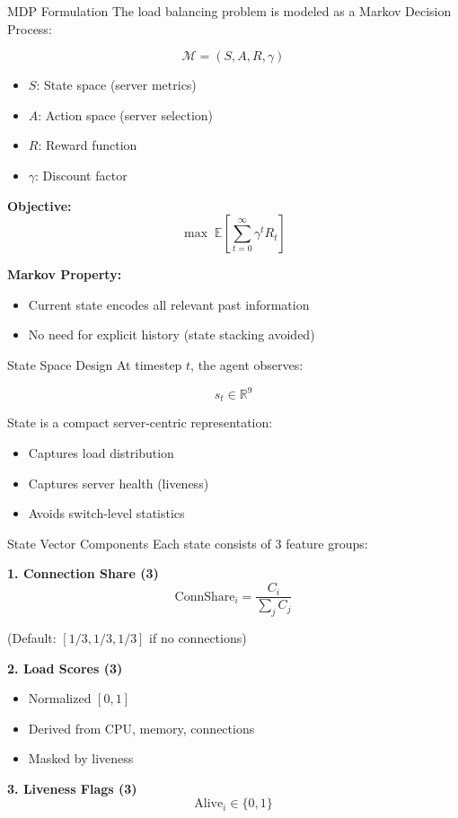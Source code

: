 \begin{frame}{MDP Formulation}
The load balancing problem is modeled as a Markov Decision Process:

\[
\mathcal{M} = (S, A, R, \gamma)
\]

\begin{itemize}
    \item $S$: State space (server metrics)
    \item $A$: Action space (server selection)
    \item $R$: Reward function
    \item $\gamma$: Discount factor
\end{itemize}

\textbf{Objective:}
\[
\max \; \mathbb{E} \left[ \sum_{t=0}^{\infty} \gamma^t R_t \right]
\]

\textbf{Markov Property:}
\begin{itemize}
    \item Current state encodes all relevant past information
    \item No need for explicit history (state stacking avoided)
\end{itemize}
\end{frame}

\begin{frame}{State Space Design}
At timestep $t$, the agent observes:

\[
s_t \in \mathbb{R}^9
\]

State is a compact server-centric representation:
\begin{itemize}
    \item Captures load distribution
    \item Captures server health (liveness)
    \item Avoids switch-level statistics
\end{itemize}
\end{frame}

\begin{frame}{State Vector Components}
Each state consists of 3 feature groups:

\textbf{1. Connection Share (3)}
\[
\text{ConnShare}_i = \frac{C_i}{\sum_j C_j}
\]

(Default: $[1/3, 1/3, 1/3]$ if no connections)

\vspace{0.3cm}

\textbf{2. Load Scores (3)}
\begin{itemize}
    \item Normalized $[0,1]$
    \item Derived from CPU, memory, connections
    \item Masked by liveness
\end{itemize}

\textbf{3. Liveness Flags (3)}
\[
\text{Alive}_i \in \{0,1\}
\]
\end{frame}

